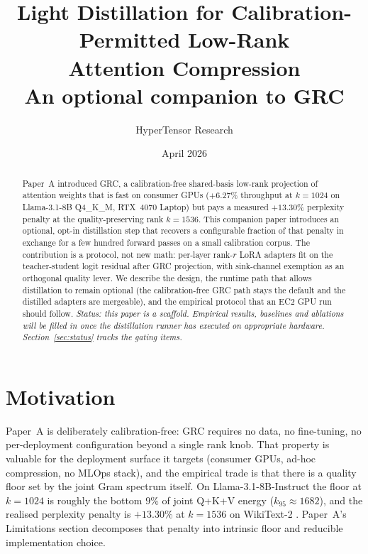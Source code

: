 \documentclass[11pt]{article}
\title{Light Distillation for Calibration-Permitted Low-Rank \\
       Attention Compression\\
       {\large An optional companion to GRC}}
\author{HyperTensor Research}
\date{April 2026}
\begin{document}
\maketitle
\hypertensorbanner

\begin{abstract}
\noindent
Paper~A introduced GRC, a calibration-free shared-basis low-rank
projection of attention weights that is fast on consumer GPUs
($+6.27\%$ throughput at $k{=}1024$ on Llama-3.1-8B Q4\_K\_M, RTX~4070
Laptop) but pays a measured $+13.30\%$ perplexity penalty at the
quality-preserving rank $k{=}1536$. This companion paper introduces an
optional, opt-in distillation step that recovers a configurable
fraction of that penalty in exchange for a few hundred forward passes
on a small calibration corpus. The contribution is a protocol, not new
math: per-layer rank-$r$ LoRA adapters \cite{hu2021lora} fit on the
teacher-student logit residual after GRC projection, with sink-channel
exemption \cite{sun2024massive,xiao2024streamingllm} as an orthogonal
quality lever. We describe the design, the runtime path that allows
distillation to remain optional (the calibration-free GRC path stays
the default and the distilled adapters are mergeable), and the
empirical protocol that an EC2 GPU run should follow. \emph{Status:
this paper is a scaffold. Empirical results, baselines and ablations
will be filled in once the distillation runner has executed on
appropriate hardware. Section~\ref{sec:status} tracks the gating
items.}
\end{abstract}

\clearpage
\tableofcontents
\clearpage

\section{Motivation}
\label{sec:motivation}

Paper~A is deliberately calibration-free: GRC requires no data, no
fine-tuning, no per-deployment configuration beyond a single rank knob.
That property is valuable for the deployment surface it targets
(consumer GPUs, ad-hoc compression, no MLOps stack), and the empirical
trade is that there is a quality floor set by the joint Gram spectrum
itself. On Llama-3.1-8B-Instruct the floor at $k{=}1024$ is roughly the
bottom $9\%$ of joint Q+K+V energy ($k_{95}{\approx}1682$), and the
realised perplexity penalty is $+13.30\%$ at $k{=}1536$ on WikiText-2
\cite{merity2017wikitext}. Paper~A's Limitations section decomposes
that penalty into intrinsic floor and reducible implementation choice.
\end{document}
